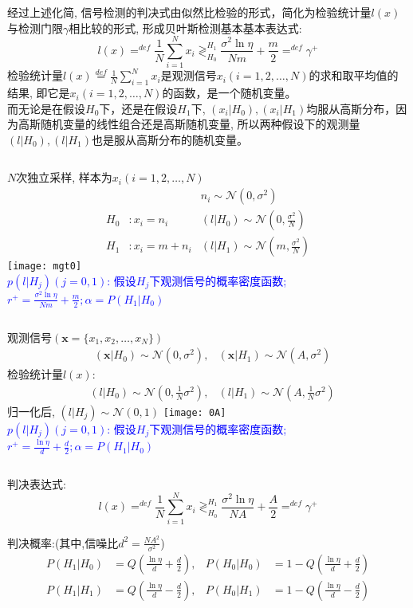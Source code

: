 \begin{frame}
\small
经过上述化简, 信号检测的判决式由似然比检验的形式，简化为检验统计量$l(x)$与检测门限$\gamma$相比较的形式, 形成贝叶斯检测基本基本表达式:
\[
l(x)\mathop{=}^{def}\frac{1}{N}\sum\limits_{i=1}^Nx_i\mathop{\gtrless}_{H_0}^{H_1}\frac{\sigma^2\ln\eta}{Nm}+\frac{m}{2}\mathop{=}^{def}\gamma^+
\]
检验统计量$l(x)\mathop{=}\limits^{def}\frac{1}{N}\sum\limits_{i=1}^Nx_i$是观测信号$x_i(i=1,2,\dots,N)$的求和取平均值的结果, 即它是$x_i(i=1,2,\dots,N)$的函数，是一个随机变量。\\
而无论是在假设$H_0$下，还是在假设$H_1$下, $(x_i|H_0),(x_i|H_1)$均服从高斯分布，因为高斯随机变量的线性组合还是高斯随机变量, 所以两种假设下的观测量$(l|H_0),(l|H_1)$也是服从高斯分布的随机变量。
\begin{columns}
	$N$次独立采样, 样本为$x_i(i=1,2,\dots,N)$
	\begin{align*}
	&&n_i\sim\mathcal{N}(0,\sigma^2)\\ 
	H_0 &:x_i=n_i   &(l|H_0)\sim\mathcal{N}(0,\frac{\sigma^2}{N})\\
	H_1 &:x_i=m+n_i &(l|H_1)\sim\mathcal{N}(m,\frac{\sigma^2}{N})
	\end{align*}
	\texttt{[image: mgt0]}\\
	\scriptsize
	\textcolor{blue}{$p(l|H_j)(j=0,1)$: 假设$H_j$下观测信号的概率密度函数; $r^+=\frac{\sigma^2\ln\eta}{Nm}+\frac{m}{2}; \alpha=P(H_1|H_0)$}
\end{columns}
\end{frame}

\begin{frame}[shrink]
\begin{columns}
	观测信号$(\bm{x}=\{x_1,x_2,\dots,x_N\})$
	\begin{align*}
	&(\bm{x}|H_0)\sim\mathcal{N}(0,\sigma^2), &(\bm{x}|H_1)\sim\mathcal{N}(A,\sigma^2)
	\end{align*}
	检验统计量$l(x)$:
	\begin{align*}
	&(l|H_0)\sim\mathcal{N}(0,\frac{1}{N}\sigma^2), &(l|H_1)\sim\mathcal{N}(A,\frac{1}{N}\sigma^2)
	\end{align*}
	归一化后, $(l|H_j)\sim\mathcal{N}(0,1)$
	\texttt{[image: 0A]}\\
	\scriptsize
	\textcolor{blue}{$p(l|H_j)(j=0,1)$: 假设$H_j$下观测信号的概率密度函数; $r^+=\frac{\ln\eta}{d}+\frac{d}{2}; \alpha=P(H_1|H_0)$}
\end{columns}

\bigskip

判决表达式:
\[
l(x)\mathop{=}^{def}\frac{1}{N}\sum\limits_{i=1}^Nx_i\mathop{\gtrless}_{H_0}^{H_1}\frac{\sigma^2\ln\eta}{NA}+\frac{A}{2}\mathop{=}^{def}\gamma^+
\]

判决概率:(其中,信噪比$d^2=\frac{NA^2}{\sigma^2}$)
\begin{align*}
	P(H_1|H_0)&=Q\left(\frac{\ln\eta}{d}+\frac{d}{2}\right), &P(H_0|H_0)&=1-Q\left(\frac{\ln\eta}{d}+\frac{d}{2}\right)\\
	P(H_1|H_1)&=Q\left(\frac{\ln\eta}{d}-\frac{d}{2}\right),
	&P(H_0|H_1)&=1-Q\left(\frac{\ln\eta}{d}-\frac{d}{2}\right)
\end{align*}
\end{frame}

